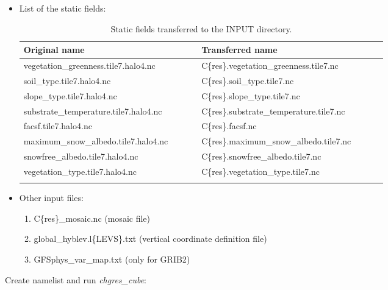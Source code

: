 \documentclass[11pt,fleqn]{report}              %
\begin{document}
\begin{itemize}
\item List of the static fields:
{
\fontsize{10}{12}\selectfont
\begin{longtable}{ p{0.42\linewidth} | p{0.44\linewidth} }
\hline
\hline
Original name & Transferred name \\
\hline
 vegetation\_greenness.tile7.halo4.nc & C\{res\}.vegetation\_greenness.tile7.nc  \\
 soil\_type.tile7.halo4.nc & C\{res\}.soil\_type.tile7.nc  \\
 slope\_type.tile7.halo4.nc & C\{res\}.slope\_type.tile7.nc  \\
 substrate\_temperature.tile7.halo4.nc & C\{res\}.substrate\_temperature.tile7.nc  \\
 facsf.tile7.halo4.nc & C\{res\}.facsf.nc  \\
 maximum\_snow\_albedo.tile7.halo4.nc & C\{res\}.maximum\_snow\_albedo.tile7.nc  \\
 snowfree\_albedo.tile7.halo4.nc & C\{res\}.snowfree\_albedo.tile7.nc  \\
 vegetation\_type.tile7.halo4.nc & C\{res\}.vegetation\_type.tile7.nc  \\
\hline
\caption{Static fields transferred to the INPUT directory.}
\label{table:var_init_cold_vars}
\end{longtable}
}

\item Other input files:
\begin{enumerate}
\item C\{res\}\_mosaic.nc (mosaic file)
\item global\_hyblev.l\{LEVS\}.txt (vertical coordinate definition file)
\item GFSphys\_var\_map.txt (only for GRIB2)
\end{enumerate}
\end{itemize}


Create namelist and run {\it chgres\_cube}:
\end{document}
